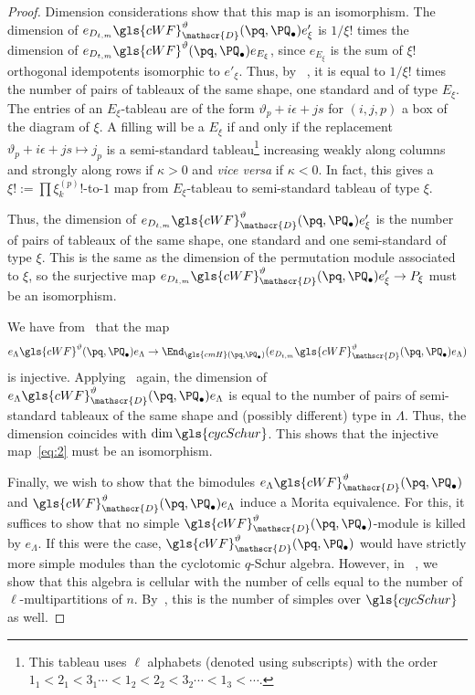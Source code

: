 \begin{proof}
 Dimension considerations show that this map is an isomorphism. 
The dimension of $e_{D_{t,m}}\gls{cWF}^\vartheta_\mathscr{D}
 (\pq,\PQ_{\bullet}) e'_\xi$ is $1/\xi! $ times the
 dimension of $e_{D_{t,m}}\gls{cWF}^\vartheta
 (\pq,\PQ_{\bullet}) e_{E_\xi}$, since $e_{E_\xi}$ is the sum of
 $\xi! $ orthogonal idempotents isomorphic to $e'_\xi$. Thus, by
~\cite[Thm.~2.26]{WebRou}, it is equal to $1/\xi!$ times the
number of pairs of tableaux of the same shape, one standard and of
type $E_{\xi}$. 
 The entries of an $E_{\xi}$-tableau are of the form 
$\vartheta_p+i\epsilon+js$ for $(i,j,p)$ a box of the diagram of
$\xi$. A filling will be a $E_{\xi}$ if and only if the replacement
$\vartheta_p+i\epsilon+js\mapsto j_p$ is a semi-standard
tableau\footnote{This tableau uses $\ell$ alphabets (denoted using
 subscripts) with the order $1_1<2_1<3_1\cdots< 1_2<2_2<3_2\cdots<1_3<\cdots.$} increasing weakly along columns and strongly
 along rows if $\kappa>0$ and \emph{vice versa} if $\kappa<0$. In
 fact, this gives a $\xi!:=\prod \xi^{(p)}_k!$-to-$1$ map from
 $E_\xi$-tableau to semi-standard tableau of type $\xi$. 

Thus, the dimension of $e_{D_{t,m}}\gls{cWF}^\vartheta_\mathscr{D}
 (\pq,\PQ_{\bullet}) e'_\xi$ is the number of pairs of tableaux of
the same shape, one standard and one
semi-standard of type $\xi$. This is the same as the dimension of the
permutation module associated to $\xi$, so the surjective map $e_{D_{t,m}}\gls{cWF}^\vartheta_\mathscr{D}
 (\pq,\PQ_{\bullet}) e'_\xi\to P_{\xi}$ must be an isomorphism.

We have from~\cite[Lem.~3.3]{WebRou} that the map
\begin{equation}
e_\Lambda \gls{cWF}^\vartheta
 (\pq,\PQ_{\bullet})e_\Lambda \to \End_{\gls{cmH}(\pq,\PQ_\bullet)}(e_{D_{t,m}}\gls{cWF}^\vartheta_\mathscr{D}
 (\pq,\PQ_{\bullet}) e_\Lambda )\label{eq:2}
\end{equation}
is injective. Applying~\cite[Thm.~2.26]{WebRou} again, the
dimension of $e_\Lambda \gls{cWF}^\vartheta_\mathscr{D}
(\pq,\PQ_{\bullet})e_\Lambda $ is equal to the number of pairs of
semi-standard tableaux of the same shape and (possibly different) type
in $\Lambda$. Thus, the dimension coincides with $\dim
\gls{cycSchur}$. This shows that the injective map~\eqref{eq:2} must be
an isomorphism.

 Finally, we wish to show that the bimodules $e_\Lambda \gls{cWF}^\vartheta_\mathscr{D}
 (\pq,\PQ_{\bullet})$ and $\gls{cWF}^\vartheta_\mathscr{D}
 (\pq,\PQ_{\bullet})e_\Lambda $ induce a Morita equivalence. For this, it
 suffices to show that no simple $\gls{cWF}^\vartheta_\mathscr{D}
 (\pq,\PQ_{\bullet})$-module is killed by $e_\Lambda $. If this were the
 case, $\gls{cWF}^\vartheta_\mathscr{D}
 (\pq,\PQ_{\bullet})$ would have strictly more simple modules than the
 cyclotomic $q$-Schur algebra. However, in
~\cite[Thm.~2.26]{WebRou}, we show that this algebra is
 cellular with the number of cells equal to the number of
 $\ell$-multipartitions of $n$. By~\cite[6.16]{DJM}, this is the
 number of simples over $\gls{cycSchur}$ as well.
\end{proof}

